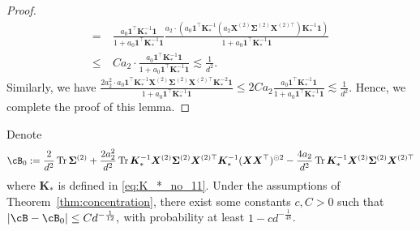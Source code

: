 \documentclass[twoside,11pt]{article}
\def\bK{{\boldsymbol K}}
\def\bX{{\boldsymbol X}}
\def\bSigma{{\boldsymbol \Sigma}}
\renewcommand{\bK}{\boldsymbol{K}}
\newcommand{\Tr}{\operatorname{Tr}}
\newcommand{\1}{\mathbf{1}}
\begin{document}
\begin{proof}
\begin{align}
    = ~& \frac{ a_0\1^\top \bK_*^{-1}\1 }{1+a_0\1^\top\bK_*^{-1}\1} \frac{a_2\cdot ( a_0\1^\top \bK_*^{-1}(a_2\bX^{(2)}\bSigma^{(2)}\bX^{(2)\top})\bK_*^{-1}\1) }{ 1+a_0\1^\top\bK_*^{-1}\1 }\\
    \le~& Ca_2\cdot\frac{ a_0\1^\top\bK_*^{-1}\1}{{ 1+a_0\1^\top\bK_*^{-1}\1 }}\lesssim \frac{1}{d^2}.
\end{align} 
Similarly, we have
$\frac{2a_2^2\cdot a_0\1^\top \bK_*^{-1}\bX^{(2)}\bSigma^{(2)}\bX^{(2)\top}\bK_*^{-2}\1 }{1+a_0\1^\top\bK_*^{-1}\1}\le 2Ca_2\frac{ a_0\1^\top \bK_*^{-1}\1 }{1+a_0\1^\top\bK_*^{-1}\1}  \lesssim \frac{1}{d^2}$. Hence, we complete the proof of this lemma.
\end{proof}



\begin{lemma}\label{lemm:approx_bias}
Denote $$\cB_0:= \frac{2}{d^2 } \Tr\bSigma^{(2)}  + \frac{ 2a_2^2}{d^2}\Tr \bK_{*}^{-1}\bX^{(2)}\bSigma^{(2)}\bX^{(2)\top}\bK_{*}^{-1}(\bX\bX^\top)^{\odot 2}-\frac{4a_2}{d^2}\Tr\bK_{*}^{-1}\bX^{(2)}\bSigma^{(2)}\bX^{(2)\top}
$$ 
where $\bK_*$ is defined in \eqref{eq:K_*_no_11}. Under the assumptions of Theorem~\ref{thm:concentration}, there exist some constants $c,C>0$ such that 
$
    \left|\cB-\cB_0\right|\le C d^{-\frac{1}{12}},
$
with probability at least $1-cd^{-\frac{1}{48}}$.
\end{lemma}
\end{document}
